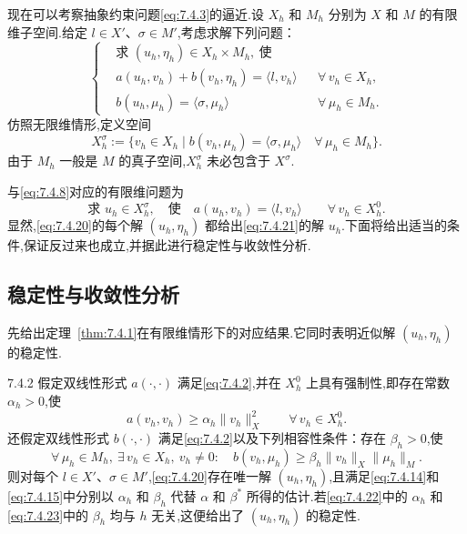 现在可以考察抽象约束问题\eqref{eq:7.4.3}的逼近.设 \(X_h\) 和 \(M_h\) 分别为 \(X\) 和 \(M\) 的有限维子空间.给定 \(l\in X'\)、\(\sigma\in M'\),考虑求解下列问题：
\begin{equation}\label{eq:7.4.20}
  \left\{
  \begin{aligned}
    &\text{求 }(u_h,\eta_h)\in X_h\times M_h,\ \text{使}\\
    &a(u_h,v_h)+b(v_h,\eta_h)=\langle l,v_h\rangle&&\forall\,v_h\in X_h,\\
    &b(u_h,\mu_h)=\langle\sigma,\mu_h\rangle&&\forall\,\mu_h\in M_h.
  \end{aligned}
  \right.
\end{equation}
仿照无限维情形,定义空间
\[
  X_h^\sigma:=\{v_h\in X_h\mid b(v_h,\mu_h)=\langle\sigma,\mu_h\rangle
     \quad\forall\,\mu_h\in M_h\}.
\]
由于 \(M_h\) 一般是 \(M\) 的真子空间,\(X_h^\sigma\) 未必包含于 \(X^\sigma\).

与\eqref{eq:7.4.8}对应的有限维问题为
\begin{equation}\label{eq:7.4.21}
  \text{求 }u_h\in X_h^\sigma,\quad\text{使}\quad
    a(u_h,v_h)=\langle l,v_h\rangle\qquad\forall\,v_h\in X_h^0.
\end{equation}
显然,\eqref{eq:7.4.20}的每个解 \((u_h,\eta_h)\) 都给出\eqref{eq:7.4.21}的解 \(u_h\).下面将给出适当的条件,保证反过来也成立,并据此进行稳定性与收敛性分析.

\subsection{稳定性与收敛性分析}\label{sec:7.4.2}

先给出定理~\ref{thm:7.4.1}在有限维情形下的对应结果.它同时表明近似解 \((u_h,\eta_h)\) 的稳定性.

\begin{theorem}[稳定性]{7.4.2}
假定双线性形式 \(a(\cdot,\cdot)\) 满足\eqref{eq:7.4.2},并在 \(X_h^0\) 上具有强制性,即存在常数 \(\alpha_h>0\),使
\begin{equation}\label{eq:7.4.22}
  a(v_h,v_h)\ge\alpha_h\|v_h\|_X^2\qquad\forall\,v_h\in X_h^0.
\end{equation}
还假定双线性形式 \(b(\cdot,\cdot)\) 满足\eqref{eq:7.4.2}以及下列相容性条件：存在 \(\beta_h>0\),使
\begin{equation}\label{eq:7.4.23}
  \forall\,\mu_h\in M_h,\ \exists\,v_h\in X_h,\ v_h\ne0:\quad
     b(v_h,\mu_h)\ge\beta_h\|v_h\|_X\|\mu_h\|_M.
\end{equation}
则对每个 \(l\in X'\)、\(\sigma\in M'\),\eqref{eq:7.4.20}存在唯一解 \((u_h,\eta_h)\),且满足\eqref{eq:7.4.14}和\eqref{eq:7.4.15}中分别以 \(\alpha_h\) 和 \(\beta_h\) 代替 \(\alpha\) 和 \(\beta^*\) 所得的估计.若\eqref{eq:7.4.22}中的 \(\alpha_h\) 和\eqref{eq:7.4.23}中的 \(\beta_h\) 均与 \(h\) 无关,这便给出了 \((u_h,\eta_h)\) 的稳定性.
\end{theorem}

